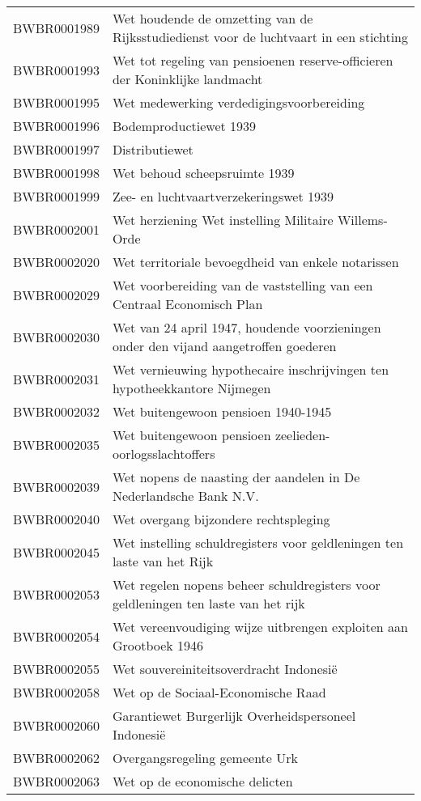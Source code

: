 \begin{longtable}{lp{}}
BWBR0001989 & Wet houdende de omzetting van de Rijksstudiedienst voor de luchtvaart in een stichting \\
BWBR0001993 & Wet tot regeling van pensioenen reserve-officieren der Koninklijke landmacht \\
BWBR0001995 & Wet medewerking verdedigingsvoorbereiding  \\
BWBR0001996 & Bodemproductiewet 1939 \\
BWBR0001997 & Distributiewet  \\
BWBR0001998 & Wet behoud scheepsruimte 1939 \\
BWBR0001999 & Zee- en luchtvaartverzekeringswet 1939 \\
BWBR0002001 & Wet herziening Wet instelling Militaire Willems-Orde \\
BWBR0002020 & Wet territoriale bevoegdheid van enkele notarissen \\
BWBR0002029 & Wet voorbereiding van de vaststelling van een Centraal Economisch Plan  \\
BWBR0002030 & Wet van 24 april 1947, houdende voorzieningen onder den vijand aangetroffen goederen \\
BWBR0002031 & Wet vernieuwing hypothecaire inschrijvingen ten hypotheekkantore Nijmegen \\
BWBR0002032 & Wet buitengewoon pensioen 1940-1945 \\
BWBR0002035 & Wet buitengewoon pensioen zeelieden-oorlogsslachtoffers \\
BWBR0002039 & Wet nopens de naasting der aandelen in De Nederlandsche Bank N.V. \\
BWBR0002040 & Wet overgang bijzondere rechtspleging \\
BWBR0002045 & Wet instelling schuldregisters voor geldleningen ten laste van het Rijk \\
BWBR0002053 & Wet regelen nopens beheer schuldregisters voor geldleningen ten laste van het rijk \\
BWBR0002054 & Wet vereenvoudiging wijze uitbrengen exploiten aan Grootboek 1946 \\
BWBR0002055 & Wet souvereiniteitsoverdracht Indonesië \\
BWBR0002058 & Wet op de Sociaal-Economische Raad \\
BWBR0002060 & Garantiewet Burgerlijk Overheidspersoneel Indonesië \\
BWBR0002062 & Overgangsregeling gemeente Urk \\
BWBR0002063 & Wet op de economische delicten \\

\end{longtable}
